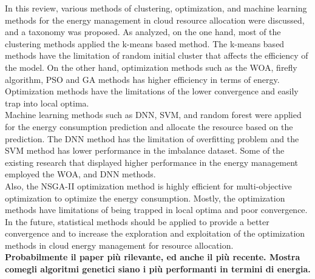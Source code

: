 In this review, various methods of clustering, optimization, and machine learning methods for the energy management in cloud resource allocation were discussed, 
and a taxonomy was proposed. As analyzed, on the one hand, most of the clustering methods applied the k-means based method. 
The k-means based methods have the limitation of random initial cluster that affects the efficiency of the model. 
On the other hand, optimization methods such as the WOA, firefly algorithm, PSO and GA methods has higher efficiency in terms of energy. 
Optimization methods have the limitations of the lower convergence and easily trap into local optima. \\
Machine learning methods such as DNN, SVM, and random forest were applied for the energy consumption prediction and allocate the resource based on the prediction. 
The DNN method has the limitation of overfitting problem and the SVM method has lower performance in the imbalance dataset. 
Some of the existing research that displayed higher performance in the energy management employed the WOA, and DNN methods. \\
Also, the NSGA-II optimization method is highly efficient for multi-objective optimization to optimize the energy consumption. 
Mostly, the optimization methods have limitations of being trapped in local optima and poor convergence. 
In the future, statistical methods should be applied to provide a better convergence and to increase the exploration and 
exploitation of the optimization methods in cloud energy management for resource allocation.\\
\textbf{Probabilmente il paper più rilevante, ed anche il più recente. Mostra comegli algoritmi genetici siano i più performanti in termini di energia.}


